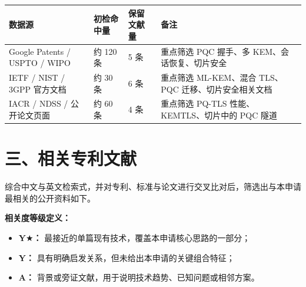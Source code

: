 \documentclass[12pt,a4paper]{article}
\begin{document}
\renewcommand{\arraystretch}{1.3}
\small
\begin{tabular}{|p{4cm}|p{3.2cm}|p{3.2cm}|p{4cm}|}
\hline
\textbf{数据源} & \textbf{初检命中量} & \textbf{保留文献量} & \textbf{备注} \\
\hline
Google Patents / USPTO / WIPO & 约 120 条 & 5 条 & 重点筛选 PQC 握手、多 KEM、会话恢复、切片安全 \\
\hline
IETF / NIST / 3GPP 官方文档 & 约 30 条 & 6 条 & 重点筛选 ML-KEM、混合 TLS、PQC 迁移、切片安全相关文档 \\
\hline
IACR / NDSS / 公开论文页面 & 约 60 条 & 4 条 & 重点筛选 PQ-TLS 性能、KEMTLS、切片中的 PQC 隧道 \\
\hline
\end{tabular}
\normalsize

\section*{三、相关专利文献}

\noindent 综合中文与英文检索式，并对专利、标准与论文进行交叉比对后，筛选出与本申请最相关的公开资料如下。

\textbf{相关度等级定义：}

\begin{itemize}[leftmargin=2em]
    \item \textbf{Y$\bigstar$：} 最接近的单篇现有技术，覆盖本申请核心思路的一部分；
    \item \textbf{Y：} 具有明确启发关系，但未给出本申请的关键组合特征；
    \item \textbf{A：} 背景或旁证文献，用于说明技术趋势、已知问题或相邻方案。
\end{itemize}
\end{document}
